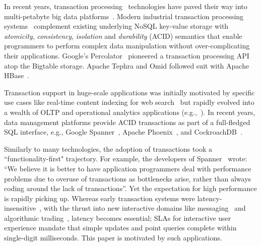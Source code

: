In recent years, transaction processing~\cite{Gray:1992:TPC:573304} technologies have paved their way into multi-petabyte big data 
platforms~\cite{Percolator2010,Spanner2012,Omid2017}. 
Modern industrial transaction processing systems~\cite{Percolator2010, Omid2017, tephra, cockroach} complement 
existing underlying NoSQL key-value storage with {\em atomicity}, {\em consistency}, {\em isolation\/} and {\em durability} (ACID) 
semantics that enable programmers to perform complex data manipulation without over-complicating their applications. 
Google's Percolator~\cite{Percolator2010} pioneered a transaction processing API atop the Bigtable storage. Apache 
Tephra and Omid followed suit with Apache HBase~\cite{hbase}. 

Transaction support in huge-scale applications was initially motivated by specific use cases like real-time content indexing for 
web search~\cite{Percolator2010, Omid2017} but  rapidly evolved into a wealth of OLTP and operational analytics 
applications (e.g.,~\cite{Borthakur:2011, F1-2013}). In recent years, data management platforms provide ACID transactions as part of a full-fledged 
SQL interface, e.g., Google Spanner~\cite{Spanner2012}, Apache Phoenix~\cite{phoenix}, and CockroachDB~\cite{cockroach}. 

Similarly to many technologies, the adoption of transactions took a  ``functionality-first" trajectory. 
For example, the developers of Spanner~\cite{Spanner2012} wrote: ``We believe it
is better to have application programmers deal with performance problems due to overuse 
of transactions as bottlenecks arise, rather than always coding around the lack of transactions''. 
Yet the expectation for high performance is rapidly picking up. 
Whereas early transaction systems were  latency-insensitive~\cite{Percolator2010, Omid2017}, 
with the thrust into new interactive domains like messaging~\cite{Borthakur:2011} and algorithmic 
trading~\cite{opentsdb}, latency becomes essential;   SLAs for interactive user experience
mandate that simple updates and point queries  complete within single-digit milliseconds. 
This paper is motivated by such  applications.


